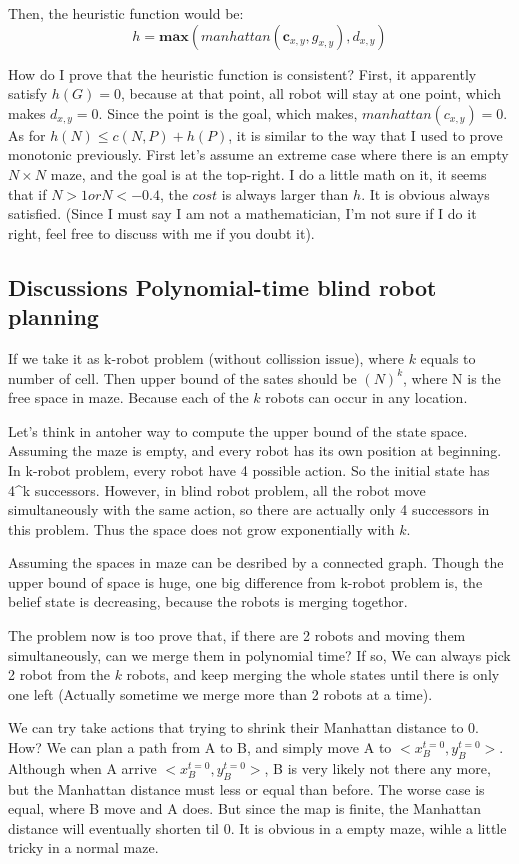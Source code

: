 \documentclass{article}
\begin{document}
Then, the heuristic function would be:
$$h =\textbf{max}(manhattan(\textbf{c}_{x,y}, g_{x,y}), d_{x,y})$$

How do I prove that the heuristic function is consistent? First, it apparently satisfy $h(G)=0$, because at that point, all robot will stay at one point, which makes $ d_{x,y} = 0$. Since the point is the goal, which makes, $manhattan(c_{x,y})=0$. As for $h(N) \leq c(N,P)+h(P) $, it is similar to the way that I used to prove monotonic previously. First let's assume an extreme case where there is an empty $N \times N$ maze, and the goal is at the top-right. I do a little math on it, it seems that if $N > 1 or N < -0.4$, the $cost$ is always larger than $h$. It is obvious always satisfied. (Since I must say I am not a mathematician, I'm not sure if I do it right, feel free to discuss with me if you doubt it).

\subsection{Discussions Polynomial-time blind robot planning}
If we take it as k-robot problem (without collission issue), where $k$ equals to number of cell. Then upper bound of the sates should be $(N)^k$, where N is the free space in maze. Because each of the $k$ robots can occur in any location.

\if
Let's think in antoher way to compute the upper bound of the state space. Assuming the maze is empty, and every robot has its own position at beginning. In k-robot problem, every robot have 4 possible action. So the initial state has 4^k successors. However, in blind robot problem, all the robot move simultaneously with the same action, so there are actually only 4 successors in this problem. Thus the space does not grow exponentially with $k$.
\fi

Assuming the spaces in maze can be desribed by a connected graph. Though the upper bound of space is huge, one big difference from k-robot problem is, the belief state is decreasing, because the robots is merging togethor.  

The problem now is too prove that, if there are 2 robots and moving them simultaneously, can we merge them in polynomial time? If so, We can always pick 2 robot from the $k$ robots, and keep merging the whole states until there is only one left (Actually sometime we merge more than 2 robots at a time).

We can try take actions that trying to shrink their Manhattan distance to 0. How? We can plan a path from A to B, and simply move A to $<x_{B}^{ t = 0}, y_{B}^{ t = 0}>$. Although when A arrive $<x_{B}^{ t = 0}, y_{B}^{ t = 0}>$, B is very likely not there any more, but the Manhattan distance must less or equal than before. The worse case is equal, where B move and A does. But since the map is finite, the Manhattan distance will eventually shorten til 0. It is obvious in a empty maze, wihle a little tricky in a normal maze.
\end{document}
